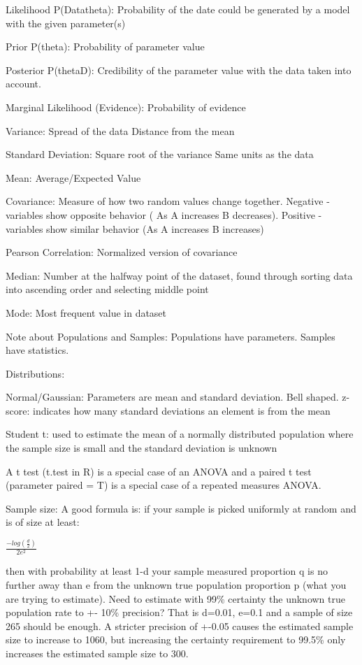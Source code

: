 \documentclass[]{book}
\begin{document}
Likelihood P(Data\textbar{}theta): Probability of the date could be
generated by a model with the given parameter(s)

Prior P(theta): Probability of parameter value

Posterior P(theta\textbar{}D): Credibility of the parameter value with
the data taken into account.

Marginal Likelihood (Evidence): Probability of evidence

Variance: Spread of the data \textbar{} Distance from the mean

Standard Deviation: Square root of the variance \textbar{} Same units as
the data

Mean: Average/Expected Value

Covariance: Measure of how two random values change together. Negative -
variables show opposite behavior ( As A increases B decreases). Positive
- variables show similar behavior (As A increases B increases)

Pearson Correlation: Normalized version of covariance

Median: Number at the halfway point of the dataset, found through
sorting data into ascending order and selecting middle point

Mode: Most frequent value in dataset

Note about Populations and Samples: Populations have parameters. Samples
have statistics.

Distributions:

Normal/Gaussian: Parameters are mean and standard deviation. Bell
shaped. z-score: indicates how many standard deviations an element is
from the mean

Student t: used to estimate the mean of a normally distributed
population where the sample size is small and the standard deviation is
unknown

A t test (t.test in R) is a special case of an ANOVA and a paired t test
(parameter paired = T) is a special case of a repeated measures ANOVA.

Sample size: A good formula is: if your sample is picked uniformly at
random and is of size at least:

\(\frac{-log(\frac{d}{2})}{2e^2}\)

then with probability at least 1-d your sample measured proportion q is
no further away than e from the unknown true population proportion p
(what you are trying to estimate). Need to estimate with 99\% certainty
the unknown true population rate to +- 10\% precision? That is d=0.01,
e=0.1 and a sample of size 265 should be enough. A stricter precision of
+-0.05 causes the estimated sample size to increase to 1060, but
increasing the certainty requirement to 99.5\% only increases the
estimated sample size to 300.
\end{document}
